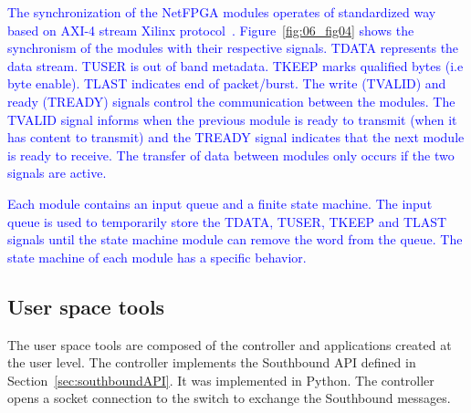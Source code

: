 \textcolor{blue}{The synchronization of the NetFPGA modules operates of standardized way based on AXI-4 stream Xilinx protocol~\cite{XilinxAXI4}. Figure~\ref{fig:06_fig04} shows the 
synchronism of the modules with their respective signals. TDATA represents the data stream. TUSER is out of band metadata. TKEEP marks qualified bytes (i.e byte enable). TLAST indicates end of packet/burst. The write (TVALID) and ready (TREADY) signals control the communication between the modules. The TVALID signal informs when the previous module is ready to transmit (when it has content to transmit) and the TREADY signal indicates that the next module is ready to receive. The transfer of data between modules only occurs if the two signals are active.} 

\textcolor{blue}{Each module contains an input queue and a finite state machine. The input queue is used to temporarily store the TDATA, TUSER, TKEEP  and TLAST signals until the state machine module can remove the word from the queue. The state machine of each module has a specific behavior.}

\subsection{User space tools}

\color{red}
The user space tools are composed of the controller and applications created at the user level.
The controller implements the Southbound API defined in Section~\ref{sec:southboundAPI}.
It was implemented in Python.
The controller opens a socket connection to the switch to exchange the Southbound messages.

